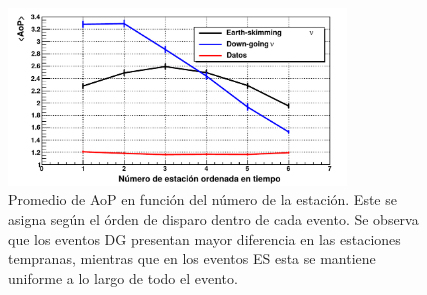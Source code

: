 	\begin{figure}[ht!]
		\begin{center}
		\includegraphics[width=0.8\textwidth]{fig/seleccionAuger/aop_vs_NStation}
		\caption{Promedio de AoP en función del número de la estación. Este se asigna según el órden de disparo dentro de cada evento. Se observa que los eventos DG presentan mayor diferencia en las estaciones tempranas, mientras que en los eventos ES esta se mantiene uniforme a lo largo de todo el evento.}
		\label{fig:aop_vs_NStation}
		\end{center}
	\end{figure}
	
